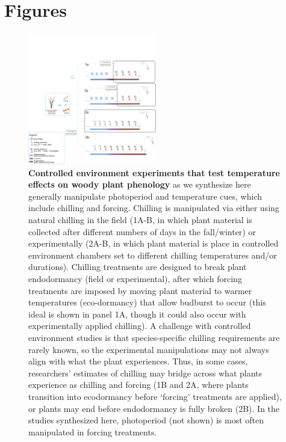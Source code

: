 \documentclass{article}
\begin{document}
\section* {Figures}
\begin{figure}[h!]
\centering
\noindent 
\includegraphics[width=0.5\textwidth]{figures/concept/Fig_bbconcept_dormant_V5.png}

\caption{\textbf{Controlled environment experiments that test temperature effects on woody plant phenology} as we synthesize here generally manipulate photoperiod and temperature cues, which include chilling and forcing. Chilling is manipulated via either using natural chilling in the field (1A-B, in which plant material is collected after different numbers of days in the fall/winter) or experimentally (2A-B, in which plant material is place in controlled environment chambers set to different chilling temperatures and/or durations). Chilling treatments are designed to break plant endodormancy (field or experimental), after which forcing treatments are imposed by moving plant material to warmer temperatures (eco-dormancy) that allow budburst to occur (this ideal is shown in panel 1A, though it could also occur with experimentally applied chilling). A challenge with controlled environment studies is that species-specific chilling requirements are rarely known, so the experimental manipulations may not always align with what the plant experiences. Thus, in some cases, researchers' estimates of chilling may bridge across what plants experience as chilling and forcing (1B and 2A, where plants transition into ecodormancy before `forcing' treatments are applied), or plants may end before endodormancy is fully broken (2B). In the studies synthesized here, photoperiod (not shown) is most often manipulated in forcing treatments.}%
\label{fig:concept}  
\end{figure}
\end{document}
